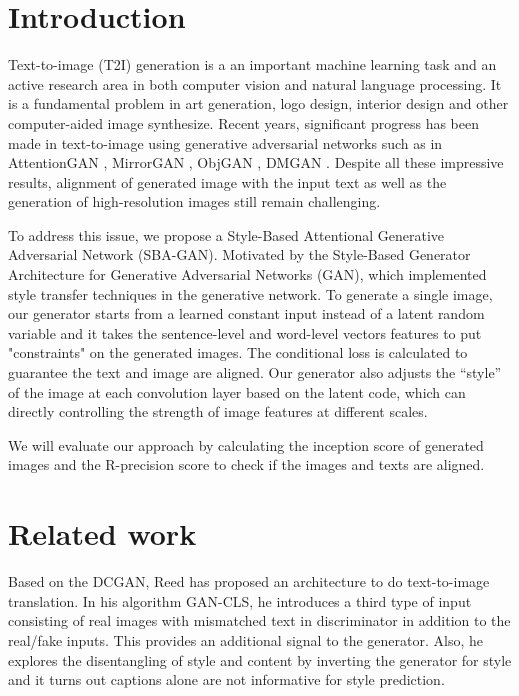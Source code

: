\documentclass{article}
\begin{document}
\section{Introduction}

Text-to-image (T2I) generation is a an important machine learning task and an active research area in both computer vision and natural language processing. It is a fundamental problem in art generation, logo design, interior design and other computer-aided image synthesize. Recent years, significant progress has been made in text-to-image using generative adversarial networks \cite{gan} such as in AttentionGAN \cite{attngan}, MirrorGAN \cite{mirrorgan}, ObjGAN \cite{objgan}, DMGAN \cite{dmgan}. Despite all these impressive results, alignment of generated image with the input text as well as the generation of high-resolution images still remain challenging.

To address this issue, we propose a Style-Based Attentional Generative Adversarial Network (SBA-GAN). Motivated by the Style-Based Generator Architecture for Generative Adversarial Networks (GAN)\cite{stylegan}, which implemented style transfer techniques\cite{styletransferog} in the generative network.  To generate a single image, our generator starts from a learned constant input instead of a latent random variable and it takes the sentence-level and word-level vectors features to put "constraints" on the generated images. The conditional loss is calculated to guarantee the text and image are aligned. Our generator also adjusts the “style” of the image at each convolution layer based on the latent
code, which can directly controlling the strength of image features at different scales. 

We will evaluate our approach by calculating the inception score\cite{inception} of generated images and the R-precision score\cite{attngan} to check if the images and texts are aligned.

\section{Related work}

Based on the DCGAN\cite{dcgan}, Reed has proposed an architecture to do text-to-image translation. In his algorithm GAN-CLS\cite{text2image}, he introduces a third type of input consisting of real images with mismatched text in discriminator in addition to the real/fake inputs. This provides an additional signal to the generator. Also, he explores the disentangling of style and content by inverting the generator for style and it turns out captions alone are not informative for style prediction.
\end{document}
